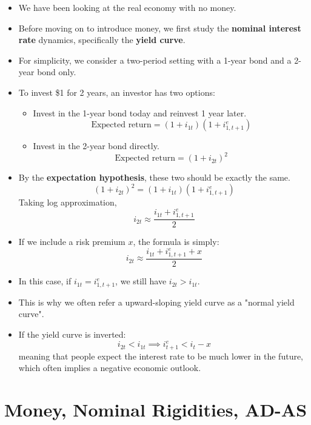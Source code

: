 \documentclass[notitlepage]{article}
\begin{document}
\begin{itemize}
\item We have been looking at the real economy with no money.
\item Before moving on to introduce money, we first study the \textbf{nominal interest rate} dynamics, specifically the \textbf{yield curve}.
\item For simplicity, we consider a two-period setting with a 1-year bond and a 2-year bond only.
\item To invest \$1 for 2 years, an investor has two options:
\begin{itemize}
\item Invest in the 1-year bond today and reinvest 1 year later.
\[
\text{Expected return} = (1+i_{1t})(1+{i^e_{1,t+1}})
\]
\item Invest in the 2-year bond directly.
\[
\text{Expected return} = (1+i_{2t})^2
\]
\end{itemize}
\item By the \textbf{expectation hypothesis}, these two should be exactly the same.
\[
(1+i_{2t})^2 = (1+i_{1t})(1+{i^e_{1,t+1}})
\]
Taking log approximation,
\[
i_{2t} \approx \frac{i_{1t}+{i^e_{1,t+1}}}{2}
\]
\item If we include a risk premium $x$, the formula is simply:
\[
i_{2t} \approx \frac{i_{1t}+i^e_{1,t+1}+x}{2}
\]
\item In this case, if $i_{1t}=i^e_{1,t+1}$, we still have $i_{2t} > i_{1t}$.
\item This is why we often refer a upward-sloping yield curve as a "normal yield curve".
\item If the yield curve is inverted:
\[
i_{2t} < i_{1t} \implies i^e_{t+1} < i_t - x
\]
meaning that people expect the interest rate to be much lower in the future, which often implies a negative economic outlook.
\end{itemize}

\section{Money, Nominal Rigidities, AD-AS}
\end{document}
